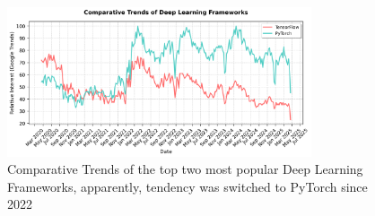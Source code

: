 \begin{figure}[h]
  \centering
  \includegraphics[width=0.8\textwidth]{Cap2/Figures/dl_frameworks_trends.png}
  \caption{Comparative Trends of the top two most popular Deep
  Learning Frameworks, apparently, tendency was switched to PyTorch since 2022}
  \label{fig:dl_frameworks_trends}
\end{figure}
